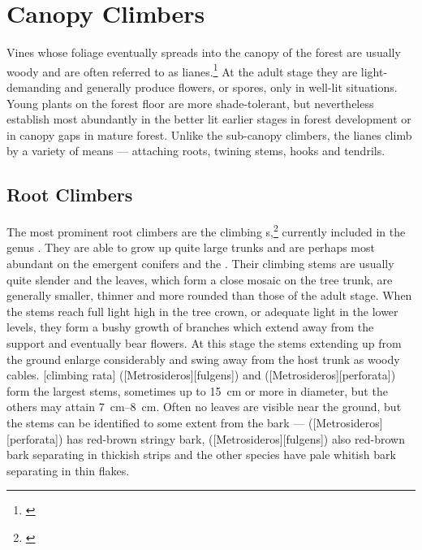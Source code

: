 \section{Canopy Climbers}

Vines whose foliage eventually spreads into the canopy of the forest are usually woody and are often referred to as lianes.\footnote{\cite{bird1916observations}}
At the adult stage they are light-demanding and generally produce flowers, or spores, only in well-lit situations.
Young plants on the forest floor are more shade-tolerant, but nevertheless establish most abundantly in the better lit earlier stages in forest development or in canopy gaps in mature forest.
Unlike the sub-canopy climbers, the lianes climb by a variety of means --- attaching roots, twining stems, hooks and tendrils.

\subsection{Root Climbers}

The most prominent root climbers are the climbing s,\footnote{\cite{dawson1967growth}} currently included in the genus .
They are able to grow up quite large trunks and are perhaps most abundant on the emergent conifers and the .
Their climbing stems are usually quite slender and the leaves, which form a close mosaic on the tree trunk, are generally smaller, thinner and more rounded than those of the adult stage.
When the stems reach full light high in the tree crown, or adequate light in the lower levels, they form a bushy growth of branches which extend away from the support and eventually bear flowers.
At this stage the stems extending up from the ground enlarge considerably and swing away from the host trunk as woody cables.
[climbing rata] ([Metrosideros][fulgens]) and  ([Metrosideros][perforata]) form the largest stems, sometimes up to \SI{15}{\centi\metre} or more in diameter, but the others may attain \SIrange{7}{8}{\centi\metre}.
Often no leaves are visible near the ground, but the stems can be identified to some extent from the bark ---  ([Metrosideros][perforata]) has red-brown stringy bark,  ([Metrosideros][fulgens]) also red-brown bark separating in thickish strips and the other species have pale whitish bark separating in thin flakes.

